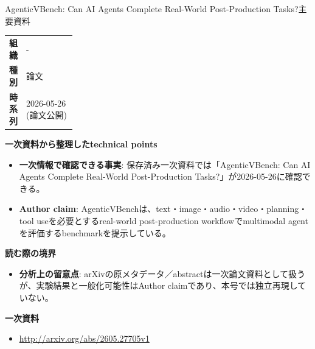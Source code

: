 \begin{technicalnote}{AgenticVBench: Can AI Agents Complete Real-World Post-Production Tasks?}{主要資料}
\begingroup
\begin{tabularx}{\linewidth}{@{}>{\bfseries}p{0.22\linewidth}X@{}}
組織 & - \\
種別 & 論文 \\
時系列 & 2026-05-26 (論文公開) \\
\end{tabularx}
\smallskip
{\bfseries 一次資料から整理したtechnical points}
\begin{itemize}[leftmargin=1.5em,itemsep=0.35em]
\item \textbf{一次情報で確認できる事実}: 保存済み一次資料では「AgenticVBench: Can AI Agents Complete Real-World Post-Production Tasks?」が2026-05-26に確認できる。
\end{itemize}
\begin{minipage}{\linewidth}
\begin{itemize}[leftmargin=1.5em,itemsep=0.35em]
\item \textbf{Author claim}: AgenticVBenchは、text・image・audio・video・planning・tool useを必要とするreal-world post-production workflowでmultimodal agentを評価するbenchmarkを提示している。
\end{itemize}
{\bfseries 読む際の境界}
\begin{itemize}[leftmargin=1.5em,itemsep=0.35em]
\item \textbf{分析上の留意点}: arXivの原メタデータ／abstractは一次論文資料として扱うが、実験結果と一般化可能性はAuthor claimであり、本号では独立再現していない。
\end{itemize}
\begin{samepage}
{\bfseries 一次資料}
\begingroup\sloppy
\begin{itemize}[leftmargin=1.5em,itemsep=0.25em]
\item {\scriptsize\url{http://arxiv.org/abs/2605.27705v1}}
\end{itemize}
\endgroup
\end{samepage}
\end{minipage}
\endgroup
\end{technicalnote}
\medskip

